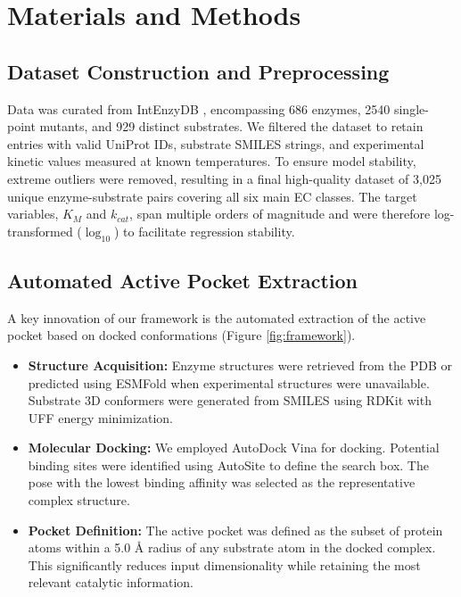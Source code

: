 \documentclass[11pt, a4paper]{article}
\begin{document}
\section{Materials and Methods}
\label{sec:methods}

\subsection{Dataset Construction and Preprocessing}
Data was curated from IntEnzyDB \cite{yan2022intenzydb}, encompassing 686 enzymes, 2540 single-point mutants, and 929 distinct substrates. We filtered the dataset to retain entries with valid UniProt IDs, substrate SMILES strings, and experimental kinetic values measured at known temperatures. To ensure model stability, extreme outliers were removed, resulting in a final high-quality dataset of 3,025 unique enzyme-substrate pairs covering all six main EC classes.
The target variables, $K_M$ and $k_{cat}$, span multiple orders of magnitude and were therefore log-transformed ($\log_{10}$) to facilitate regression stability.

\subsection{Automated Active Pocket Extraction}
A key innovation of our framework is the automated extraction of the active pocket based on docked conformations (Figure \ref{fig:framework}).
\begin{itemize}
    \item \textbf{Structure Acquisition:} Enzyme structures were retrieved from the PDB or predicted using ESMFold when experimental structures were unavailable. Substrate 3D conformers were generated from SMILES using RDKit with UFF energy minimization.
    \item \textbf{Molecular Docking:} We employed AutoDock Vina for docking. Potential binding sites were identified using AutoSite to define the search box. The pose with the lowest binding affinity was selected as the representative complex structure.
    \item \textbf{Pocket Definition:} The active pocket was defined as the subset of protein atoms within a 5.0 \AA{} radius of any substrate atom in the docked complex. This significantly reduces input dimensionality while retaining the most relevant catalytic information.
\end{itemize}
\end{document}
